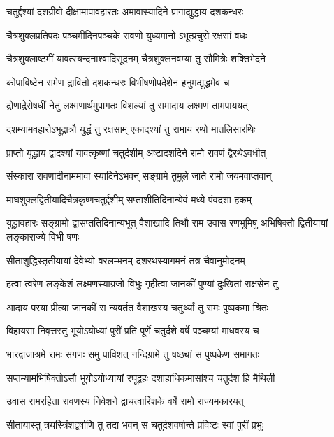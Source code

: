 \twolineshloka
{चतुर्द्दश्यां दशग्रीवो दीक्षामापावहारतः}
{अमावास्यादिने प्रागाद्युद्धाय दशकन्धरः}%

\twolineshloka
{चैत्रशुक्लप्रतिपदः पञ्चमीदिनपञ्चके}
{रावणो युध्यमानो ऽभूत्प्रचुरो रक्षसां वधः}%

\twolineshloka
{चैत्रशुक्लाष्टमीं यावत्स्यन्दनाश्वादिसूदनम्}
{चैत्रशुक्लनवम्यां तु सौमित्रेः शक्तिभेदने}%

\twolineshloka
{कोपाविष्टेन रामेण द्रावितो दशकन्धरः}
{विभीषणोपदेशेन हनुमद्युद्धमेव च}%

\twolineshloka
{द्रोणाद्रेरोषधीं नेतुं लक्ष्मणार्थमुपागतः}
{विशल्यां तु समादाय लक्ष्मणं तामपाययत्}%

\twolineshloka
{दशम्यामवहारोऽभूद्रात्रौ युद्धं तु रक्षसाम्}
{एकादश्यां तु रामाय रथो मातलिसारथिः}%

\twolineshloka
{प्राप्तो युद्धाय द्वादश्यां यावत्कृष्णां चतुर्दशीम्}
{अष्टादशदिने रामो रावणं द्वैरथेऽवधीत्}%

\twolineshloka
{संस्कारा रावणादीनाममावा स्यादिनेऽभवन्}
{सङ्ग्रामे तुमुले जाते रामो जयमवाप्तवान्}%

\twolineshloka
{माघशुक्लद्वितीयादिचैत्रकृष्णचतुर्द्दशीम्}
{सप्ताशीतिदिनान्येवं मध्ये पंवदशा हकम्}%

\threelineshloka
{युद्धावहारः सङ्ग्रामो द्वासप्ततिदिनान्यभूत्}
{वैशाखादि तिथौ राम उवास रणभूमिषु}
{अभिषिक्तो द्वितीयायां लङ्काराज्ये विभी षणः}%

\twolineshloka
{सीताशुद्धिस्तृतीयायां देवेभ्यो वरलम्भनम्}
{दशरथस्यागमनं तत्र चैवानुमोदनम्}%

\twolineshloka
{हत्वा त्वरेण लङ्केशं लक्ष्मणस्याग्रजो विभुः}
{गृहीत्वा जानकीं पुण्यां दुःखितां राक्षसेन तु}%

\twolineshloka
{आदाय परया प्रीत्या जानकीं स न्यवर्तत}
{वैशाखस्य चतुर्थ्यां तु रामः पुष्पकमा श्रितः}%

\twolineshloka
{विहायसा निवृत्तस्तु भूयोऽयोध्यां पुरीं प्रति}
{पूर्णे चतुर्दशे वर्षे पञ्चम्यां माधवस्य च}%

\twolineshloka
{भारद्वाजाश्रमे रामः सगणः समु पाविशत्}
{नन्दिग्रामे तु षष्ठ्यां स पुष्पकेण समागतः}%

\twolineshloka
{सप्तम्यामभिषिक्तोऽसौ भूयोऽयोध्यायां रघूद्वहः}
{दशाहाधिकमासांश्च चतुर्दश हि मैथिली}%

\twolineshloka
{उवास रामरहिता रावणस्य निवेशने}
{द्वाचत्वारिंशके वर्षे रामो राज्यमकारयत्}%

\twolineshloka
{सीतायास्तु त्रयस्त्रिंशद्वर्षाणि तु तदा भवन्}
{स चतुर्दशवर्षान्ते प्रविष्टः स्वां पुरीं प्रभुः}%

